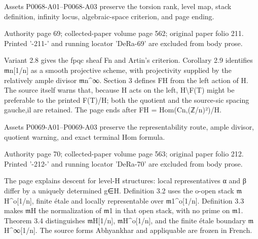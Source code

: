 \documentclass[11pt,a4paper]{article}
\begin{document}
Assets P0068-A01--P0068-A03 preserve the torsion rank, level map, stack definition, infinity locus, algebraic-space criterion, and page ending.


\par\medskip
\hypertarget{D018-P0069}{}
\par\smallskip
Authority page 69; collected-paper volume page 562; original paper folio 211. Printed '-211-' and running locator 'DeRa-69' are excluded from body prose.

Variant 2.8 gives the fpqc sheaf F\textunderscore{}n and Artin's criterion. Corollary 2.9 identifies \ensuremath{\mathfrak{m}}\textunderscore{}n[1/n] as a smooth projective scheme, with projectivity supplied by the relatively ample divisor \ensuremath{\mathfrak{m}}\textunderscore{}n\textasciicircum{}∞. Section 3 defines F\textunderscore{}H from the left action of H. The source itself warns that, because H acts on the left, H\textbackslash{}F(T) might be preferable to the printed F(T)/H; both the quotient and the source-sic spacing gauche,il are retained. The page ends after F\textunderscore{}H = Hom(C\textunderscore{}n,(ℤ/n)²)/H.

Assets P0069-A01--P0069-A03 preserve the representability route, ample divisor, quotient warning, and exact terminal Hom formula.


\par\medskip
\hypertarget{D018-P0070}{}
\par\smallskip
Authority page 70; collected-paper volume page 563; original paper folio 212. Printed '-212-' and running locator 'DeRa-70' are excluded from body prose.

The page explains descent for level-H structures: local representatives α and β differ by a uniquely determined g∈H. Definition 3.2 uses the o-open stack \ensuremath{\mathfrak{m}}\textunderscore{}H\textasciicircum{}o[1/n], finite étale and locally representable over \ensuremath{\mathfrak{m}}\textunderscore{}1\textasciicircum{}o[1/n]. Definition 3.3 makes \ensuremath{\mathfrak{m}}\textunderscore{}H the normalization of \ensuremath{\mathfrak{m}}\textunderscore{}1 in that open stack, with no prime on \ensuremath{\mathfrak{m}}\textunderscore{}1. Theorem 3.4 distinguishes \ensuremath{\mathfrak{m}}\textunderscore{}H[1/n], \ensuremath{\mathfrak{m}}\textunderscore{}H\textasciicircum{}o[1/n], and the finite étale boundary \ensuremath{\mathfrak{m}}\textunderscore{}H\textasciicircum{}∞[1/n]. The source forms Abhyankhar and appliquable are frozen in French.
\end{document}
